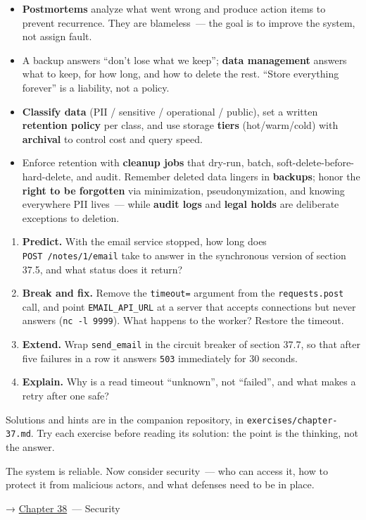 \begin{takeaways}
\begin{itemize}
\item
  \textbf{Postmortems} analyze what went wrong and produce action items to prevent recurrence. They are blameless~--- the goal is to improve the system, not assign fault.
\item
  A backup answers ``don't lose what we keep''; \textbf{data management} answers what to keep, for how long, and how to delete the rest. ``Store everything forever'' is a liability, not a policy.
\item
  \textbf{Classify data} (PII / sensitive / operational / public), set a written \textbf{retention policy} per class, and use storage \textbf{tiers} (hot/warm/cold) with \textbf{archival} to control cost and query speed.
\item
  Enforce retention with \textbf{cleanup jobs} that dry-run, batch, soft-delete-before-hard-delete, and audit. Remember deleted data lingers in \textbf{backups}; honor the \textbf{right to be forgotten} via minimization, pseudonymization, and knowing everywhere PII lives~--- while \textbf{audit logs} and \textbf{legal holds} are deliberate exceptions to deletion.
\end{itemize}

\end{takeaways}

\label{37-reliability:exercises}

\begin{enumerate}
\def\labelenumi{\arabic{enumi}.}
\tightlist
\item
  \textbf{Predict.} With the email service stopped, how long does \texttt{POST\ /}\allowbreak{}\texttt{notes/}\allowbreak{}\texttt{1/}\allowbreak{}\texttt{email} take to answer in the synchronous version of section 37.5, and what status does it return?
\item
  \textbf{Break and fix.} Remove the \texttt{timeout=} argument from the \texttt{requests.post} call, and point \texttt{EMAIL\_API\_URL} at a server that accepts connections but never answers (\texttt{nc\ -l\ 9999}). What happens to the worker? Restore the timeout.
\item
  \textbf{Extend.} Wrap \texttt{send\_email} in the circuit breaker of section 37.7, so that after five failures in a row it answers \texttt{503} immediately for 30 seconds.
\item
  \textbf{Explain.} Why is a read timeout ``unknown'', not ``failed'', and what makes a retry after one safe?
\end{enumerate}

\noindent{}Solutions and hints are in the companion repository, in \texttt{exercises/}\allowbreak{}\texttt{chapter-37.md}. Try each exercise before reading its solution: the point is the thinking, not the answer.

\label{37-reliability:whats-next}

The system is reliable. Now consider security~--- who can access it, how to protect it from malicious actors, and what defenses need to be in place.

\noindent{}→ \hyperref[ch:38-security]{Chapter 38}~--- Security
